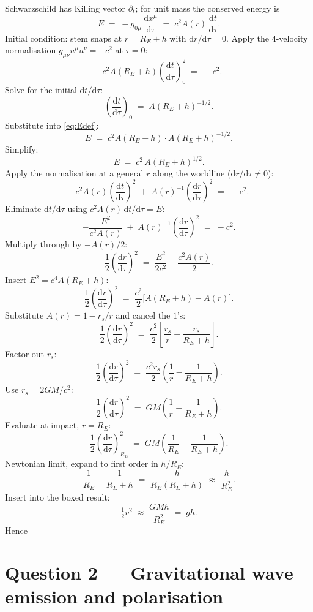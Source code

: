 \documentclass[11pt]{article}
\newcommand{\de}{\mathrm{d}}
\begin{document}
Schwarzschild has Killing vector $\partial_t$; for unit mass the conserved energy is
\begin{equation}
E \;=\; -g_{0\mu}\,\frac{\de x^\mu}{\de\tau} \;=\; c^2 A(r)\,\frac{\de t}{\de\tau}.
\label{eq:Edef}
\end{equation}
Initial condition: stem snaps at $r=R_E+h$ with $\de r/\de\tau=0$. Apply the 4-velocity normalisation $g_{\mu\nu}u^\mu u^\nu=-c^2$ at $\tau=0$:
\[
-c^2 A(R_E+h)\!\left(\frac{\de t}{\de\tau}\right)^{2}_{\!\!0} \;=\; -c^2.
\]
Solve for the initial $\de t/\de\tau$:
\[
\!\left(\frac{\de t}{\de\tau}\right)_{\!\!0} \;=\; A(R_E+h)^{-1/2}.
\]
Substitute into \eqref{eq:Edef}:
\[
E \;=\; c^2 A(R_E+h)\cdot A(R_E+h)^{-1/2}.
\]
Simplify:
\[
E \;=\; c^2\,A(R_E+h)^{1/2}.
\]
Apply the normalisation at a general $r$ along the worldline ($\de r/\de\tau\neq 0$):
\[
-c^2 A(r)\!\left(\frac{\de t}{\de\tau}\right)^{2} \;+\; A(r)^{-1}\!\left(\frac{\de r}{\de\tau}\right)^{2} \;=\; -c^2.
\]
Eliminate $\de t/\de\tau$ using $c^2 A(r)\,\de t/\de\tau=E$:
\[
-\frac{E^2}{c^2 A(r)} \;+\; A(r)^{-1}\!\left(\frac{\de r}{\de\tau}\right)^{2} \;=\; -c^2.
\]
Multiply through by $-A(r)/2$:
\[
\frac{1}{2}\!\left(\frac{\de r}{\de\tau}\right)^{2} \;=\; \frac{E^2}{2 c^2} - \frac{c^2 A(r)}{2}.
\]
Insert $E^2=c^4 A(R_E+h)$:
\[
\frac{1}{2}\!\left(\frac{\de r}{\de\tau}\right)^{2} \;=\; \frac{c^2}{2}\bigl[A(R_E+h) - A(r)\bigr].
\]
Substitute $A(r)=1-r_s/r$ and cancel the $1$'s:
\[
\frac{1}{2}\!\left(\frac{\de r}{\de\tau}\right)^{2} \;=\; \frac{c^2}{2}\!\left[\frac{r_s}{r} - \frac{r_s}{R_E+h}\right].
\]
Factor out $r_s$:
\[
\frac{1}{2}\!\left(\frac{\de r}{\de\tau}\right)^{2} \;=\; \frac{c^2 r_s}{2}\!\left(\frac{1}{r} - \frac{1}{R_E+h}\right).
\]
Use $r_s=2GM/c^2$:
\[
\frac{1}{2}\!\left(\frac{\de r}{\de\tau}\right)^{2} \;=\; GM\!\left(\frac{1}{r} - \frac{1}{R_E+h}\right).
\]
Evaluate at impact, $r=R_E$:
\begin{equation}
\boxed{\;\frac{1}{2}\!\left(\frac{\de r}{\de\tau}\right)^{2}_{\!\!R_E} \;=\; GM\!\left(\frac{1}{R_E} - \frac{1}{R_E+h}\right).\;}
\label{eq:apple-result}
\end{equation}
Newtonian limit, expand to first order in $h/R_E$:
\[
\frac{1}{R_E}-\frac{1}{R_E+h} \;=\; \frac{h}{R_E(R_E+h)} \;\approx\; \frac{h}{R_E^2}.
\]
Insert into the boxed result:
\[
\tfrac{1}{2}v^2 \;\approx\; \frac{GMh}{R_E^2} \;=\; gh.
\]
Hence 

\section*{Question 2 --- Gravitational wave emission and polarisation}
\end{document}
